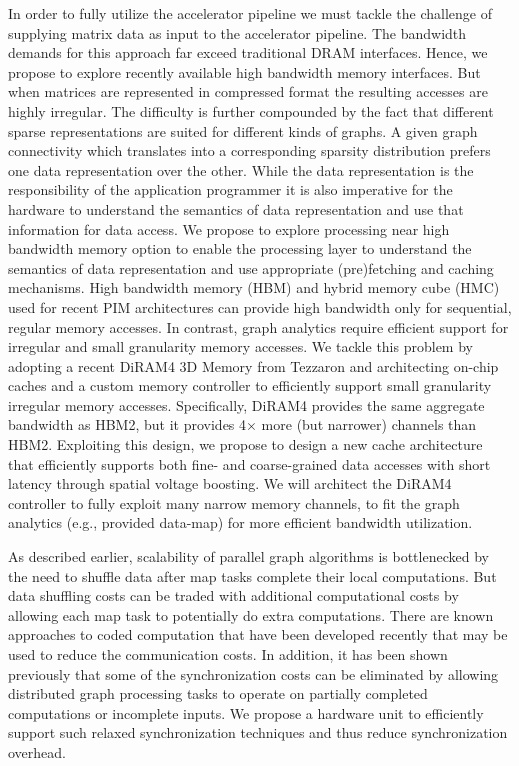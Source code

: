 In order to fully utilize the accelerator pipeline we must tackle the challenge of supplying matrix data as input to the accelerator pipeline. 
The bandwidth demands for this approach far exceed traditional DRAM interfaces. 
Hence, we propose to explore recently available high bandwidth memory interfaces.  
But when matrices are represented in compressed format the resulting accesses are highly irregular.  
The difficulty is further compounded by the fact that different sparse representations are suited for different kinds of graphs. 
A given graph connectivity which translates into a corresponding sparsity distribution prefers one data representation over the other.  
While the data representation is the responsibility of the application programmer it is also imperative for the hardware to understand the semantics of data representation and use that information for data access. 
We propose to explore processing near high bandwidth memory option to enable the processing layer to understand the semantics of data representation and use appropriate (pre)fetching and caching mechanisms.   
High bandwidth memory (HBM) and hybrid memory cube (HMC) used for recent PIM architectures can provide high bandwidth only for sequential, regular memory accesses. 
In contrast, graph analytics require efficient support for irregular and small granularity memory accesses. 
We tackle this problem by adopting a recent DiRAM4 3D Memory from Tezzaron and architecting on-chip caches and a custom memory controller to efficiently support small granularity irregular memory accesses. 
Specifically, DiRAM4 provides the same aggregate bandwidth as HBM2, but it provides 4$\times$ more (but narrower) channels than HBM2.  
Exploiting this design, we propose to design a new cache architecture that efficiently supports both fine- and coarse-grained data accesses with short latency through spatial voltage boosting. 
We will architect the DiRAM4 controller to fully exploit many narrow memory channels, to fit the graph analytics (e.g., provided data-map) for more efficient bandwidth utilization.

As described earlier, scalability of parallel graph algorithms is bottlenecked by the need to shuffle data after  map tasks complete their local computations.  
But data shuffling costs can be traded with additional computational costs by allowing each map task to potentially do extra computations. 
There are known approaches to coded computation that have been developed recently that may be used to reduce the communication costs. 
In addition, it has been shown previously that some of the synchronization costs can be eliminated by allowing distributed graph processing tasks to operate on partially completed computations or incomplete inputs. 
We propose a hardware unit to efficiently support such relaxed synchronization techniques and thus reduce synchronization overhead. 

